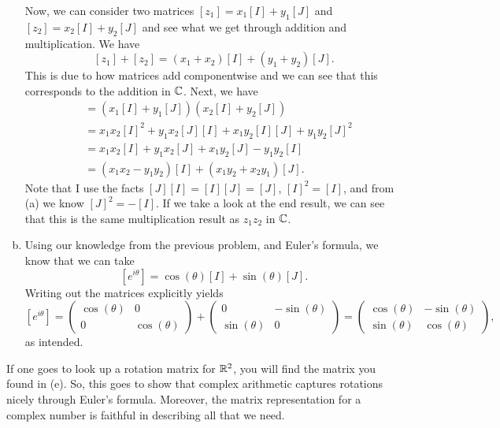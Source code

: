 \documentclass[12pt]{article} %
\begin{document}
\begin{solution}
\begin{enumerate}[(a)]
        Now, we can consider two matrices $[z_1] = x_1 [I] + y_1 [J]$ and $[z_2] = x_2 [I] + y_2 [J]$ and see what we get through addition and multiplication. We have
        \[
        [z_1] + [z_2] = (x_1 + x_2)[I] + (y_1 + y_2)[J].
        \]
        This is due to how matrices add componentwise and we can see that this corresponds to the addition in $\mathbb{C}$. Next, we have
        \begin{align*}
        [z_1][z_2] &= (x_1 [I] + y_1 [J])(x_2 [I] + y_2[J]) \\
        &= x_1 x_2 [I]^2 + y_1 x_2 [J][I] + x_1 y_2 [I][J] + y_1 y_2 [J]^2\\
        &= x_1 x_2 [I] + y_1 x_2 [J] + x_1 y_2 [J] - y_1 y_2 [I]\\
        &= (x_1 x_2 - y_1 y_2)[I] + (x_1 y_2 + x_2 y_1)[J].
        \end{align*}
        Note that I use the facts $[J][I]=[I][J]=[J]$, $[I]^2=[I]$, and from (a) we know $[J]^2=-[I]$.  If we take a look at the end result, we can see that this is the same multiplication result as $z_1 z_2$ in $\mathbb{C}$.

        \item Using our knowledge from the previous problem, and Euler's formula, we know that we can take
        \[
        [e^{i\theta}] = \cos (\theta) [I] + \sin(\theta)[J].
        \]
        Writing out the matrices explicitly yields
        \[
        [e^{i\theta}] = \begin{pmatrix} \cos(\theta) & 0 \\ 0 & \cos(\theta) \end{pmatrix} + \begin{pmatrix} 0 & - \sin(\theta) \\ \sin(\theta) & 0 \end{pmatrix} = \begin{pmatrix} \cos(\theta) & -\sin(\theta) \\ \sin(\theta) & \cos(\theta) \end{pmatrix},
        \]
        as intended.
    \end{enumerate}
\begin{remark}
    If one goes to look up a rotation matrix for $\mathbb{R}^2$, you will find the matrix you found in (e).  So, this goes to show that complex arithmetic captures rotations nicely through Euler's formula. Moreover, the matrix representation for a complex number is faithful in describing all that we need.
\end{remark}
\end{solution}
\end{document}
